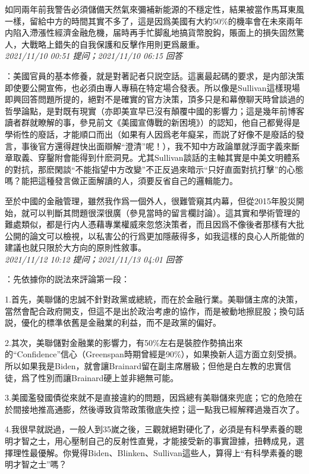 \documentclass[twocolumn]{ctexart}
\begin{document}
如同兩年前我警告必須儲備天然氣來彌補新能源的不穩定性，結果被當作馬耳東風一樣，留給中方的時間其實不多了，這是因爲美國有大約50\%的機率會在未來兩年内陷入滯漲性經濟金融危機，届時再手忙脚亂地搞貨幣脫鈎，賬面上的損失固然驚人，大戰略上錯失的自我保護和反擊作用則更爲嚴重。
\\

\textit{\hfill\noindent\small 2021/11/10 00:51 提问；2021/11/10 06:15 回答}

：美國官員的基本修養，就是對著記者只説空話。這裏最起碼的要求，是内部決策即使要公開宣佈，也必須由專人專稿在特定場合發表。所以像是Sullivan這樣現場即興回答問題所提的，絕對不是確實的官方決策，頂多只是和幕僚聊天時曾談過的哲學論點，是對既有現實（亦即美宣早已沒有顛覆中國的影響力；這是幾年前博客讀者群就瞭解的事，參見前文《美國宣傳戰的新困境》）的認知，他自己都覺得是學術性的廢話，才能順口而出（如果有人因爲老年癡呆，而説了好像不是廢話的發言，事後官方還得趕快出面辯解“澄清”呢！），我不知中方政論單就浮面字義來斷章取義、穿鑿附會能得到什麽洞見。尤其Sullivan談話的主軸其實是中美文明體系的對抗，那麽閑談“不能指望中方改變”不正反過來暗示“只好直面對抗打擊”的心態嗎？能把這種發言做正面解讀的人，須要反省自己的邏輯能力。

至於中國的金融管理，雖然我作爲一個外人，很難管窺其内幕，但從2015年股災開始，就可以判斷其問題很深很廣（參見當時的留言欄討論）。這其實和學術管理的難處類似，都是行内人憑藉專業權威來忽悠決策者，而且因爲不像後者那樣有大批公開的論文可以檢視，以私害公的行爲更加隱蔽得多，如我這樣的良心人所能做的建議也就只限於大方向的原則性敘事。
\\

\textit{\hfill\noindent\small 2021/11/12 10:12 提问；2021/11/13 04:01 回答}

：先依據你的説法來評論第一段：

1.首先，美聯儲的忠誠不針對政黨或總統，而在於金融行業。美聯儲主席的決策，當然會配合政府開支，但這不是出於政治考慮的協作，而是被動地擦屁股；換句話説，優化的標準依舊是金融業的利益，而不是政黨的偏好。

2.其次，美聯儲對金融業的影響力，有50\%左右是裝腔作勢搞出來的“Confidence”信心（Greenspan時期曾經是90\%），如果換新人這方面立刻受損。所以如果我是Biden，就會讓Brainard留在副主席層級；但他是白左教的忠實信徒，爲了性別而讓Brainard硬上並非絕無可能。

3.美國濫發國債從來就不是直接違約的問題，因爲總有美聯儲來兜底；它的危險在於間接地推高通膨，然後導致貨幣政策徹底失控；這一點我已經解釋過幾百次了。

4.我很早就説過，一般人到35嵗之後，三觀就絕對硬化了，必須是有科學素養的聰明才智之士，用心壓制自己的反射性直覺，才能接受新的事實證據，扭轉成見，選擇理性最優解。你覺得Biden、Blinken、Sullivan這些人，算得上“有科學素養的聰明才智之士”嗎？
\end{document}
